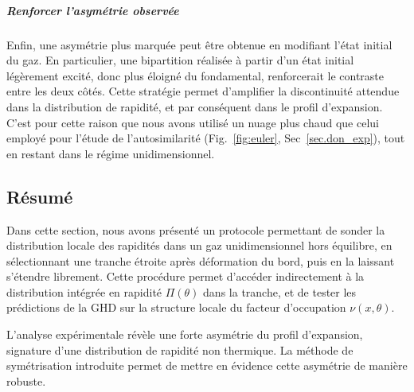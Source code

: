 \subparagraph{Renforcer l’asymétrie observée}

Enfin, une asymétrie plus marquée peut être obtenue en modifiant l’état initial du gaz. En particulier, une bipartition réalisée à partir d’un état initial légèrement excité, donc plus éloigné du fondamental, renforcerait le contraste entre les deux côtés. Cette stratégie permet d’amplifier la discontinuité attendue dans la distribution de rapidité, et par conséquent dans le profil d’expansion. C’est pour cette raison que nous avons utilisé un nuage plus chaud que celui employé pour l’étude de l’autosimilarité (Fig.~\ref{fig:euler}, Sec~\ref{sec.don_exp}), tout en restant dans le régime unidimensionnel.


\subsection*{Résumé}

Dans cette section, nous avons présenté un protocole permettant de sonder la distribution locale des rapidités dans un gaz unidimensionnel hors équilibre, en sélectionnant une tranche étroite après déformation du bord, puis en la laissant s’étendre librement. Cette procédure permet d’accéder indirectement à la distribution intégrée en rapidité $\Pi(\theta)$ dans la tranche, et de tester les prédictions de la GHD sur la structure locale du facteur d’occupation $\nu(x,\theta)$.

\medskip

L’analyse expérimentale révèle une forte asymétrie du profil d’expansion, signature d’une distribution de rapidité non thermique. La méthode de symétrisation introduite permet de mettre en évidence cette asymétrie de manière robuste.%


